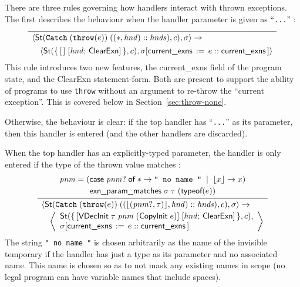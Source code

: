 \documentclass[11pt]{article}
\begin{document}
There are three rules governing how handlers interact with thrown
exceptions.  The first describes the behaviour when the handler
parameter is given as ``\texttt{...}'' :
\[
\infer{
  \begin{array}{l}
    \statebrack{
      \textsf{St}(\texttt{Catch}\;(\texttt{throw}(e))\;((*,
      \mathit{hnd})::\mathit{hnds}), c), \sigma
    }
    \to\\[1ex]
    \quad \statebrack{
      \textsf{St}(\mathbf{\{}\,[\,]\;[\mathit{hnd};\,\textsf{ClearExn}]\,\mathbf{\}}, c),
      \sigma[\textsf{current\_exns}\,:=\,e::\textsf{current\_exns}\,]
    }
  \end{array}
}{
}
\]
This rule introduces two new features, the \textsf{current\_exns}
field of the program state, and the \textsf{ClearExn} statement-form.
Both are present to support the ability of programs to use
\texttt{throw} without an argument to re-throw the ``current
exception''.  This is covered below in Section~\ref{sec:throw-none}.

Otherwise, the behaviour is clear: if the top handler has
``\texttt{...}'' as its parameter, then this handler is entered (and
the other handlers are discarded).

When the top handler has an explicitly-typed parameter, the handler is
only entered if the type of the thrown value matches
:
\[
\infer{
  \begin{array}{l}
    \statebrack{
      \textsf{St}(\texttt{Catch}\;
                    (\texttt{throw}(e))\;
                    ((\lfloor(\mathit{pnm?},\tau)\rfloor, \mathit{hnd})::
                     \mathit{hnds}),c),
      \sigma
    }
    \to\\[.5ex]
    \quad \left\langle
      \begin{array}{l}
        \textsf{St}(
           \mathbf{\{}\,[\textsf{VDecInit}\;\tau\;\mathit{pnm}\;
                                            (\textsf{CopyInit}\;e)]\;
                        [\mathit{hnd};\,\textsf{ClearExn}]\,\mathbf{\}}, c),\\
        \sigma[\textsf{current\_exns}\,:=\,e::\textsf{current\_exns}\,]
      \end{array}\right\rangle
  \end{array}
}{
  \begin{array}{c}
  \mathit{pnm} = (\textsf{case}\;\mathit{pnm?}\;\textsf{of}\;*\to \texttt{" no name "}
  \;\;|\;\; \lfloor x \rfloor \to x)\\[.5ex]
  \textsf{exn\_param\_matches}\;\sigma\;\tau\;(\textsf{typeof}(e))
  \end{array}
}
\]
The string \texttt{" no name "} is chosen arbitrarily as the name of
the invisible temporary if the handler has just a type as its
parameter and no associated name.  This name is chosen so as to not
mask any existing names in scope (no legal \cpp{} program can have
variable names that include spaces).
\end{document}
